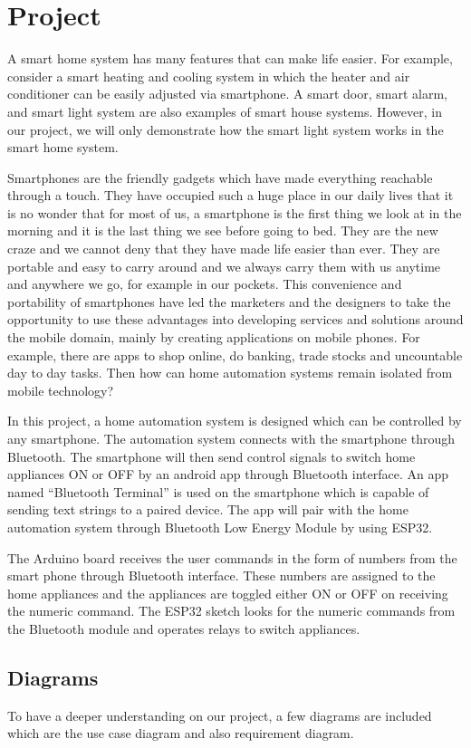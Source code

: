   \section{Project}
A smart home system has many features that can make life easier. For example, consider a smart heating and cooling system in which the heater and air conditioner can be easily adjusted via smartphone. A smart door, smart alarm, and smart light system are also examples of smart house systems. However, in our project, we will only demonstrate how the smart light system works in the smart home system.

Smartphones are the friendly gadgets which have made everything reachable through a touch. They have occupied such a huge place in our daily lives that it is no wonder that for most of us, a smartphone is the first thing we look at in the morning and it is the last thing we see before going to bed. They are the new craze and we cannot deny that they have made life easier than ever. They are portable and easy to carry around and we always carry them with us anytime and anywhere we go, for example in our pockets. This convenience and portability of smartphones have led the marketers and the designers to take the opportunity to use these advantages into developing services and solutions around the mobile domain, mainly by creating applications on mobile phones. For example, there are apps to shop online, do banking, trade stocks and uncountable day to day tasks. Then how can home automation systems remain isolated from mobile technology?
 
In this project, a home automation system is designed which can be controlled by any smartphone. The automation system connects with the smartphone through Bluetooth. The smartphone will then send control signals to switch home appliances ON or OFF by an android app through Bluetooth interface. An app named “Bluetooth Terminal” is used on the smartphone which is capable of sending text strings to a paired device. The app will pair with the home automation system through Bluetooth Low Energy Module by using ESP32.  
 
The Arduino board receives the user commands in the form of numbers from the smart phone through Bluetooth interface. These numbers are assigned to the home appliances and the appliances are toggled either ON or OFF on receiving the numeric command. The ESP32  sketch looks for the numeric commands from the Bluetooth module and operates relays to switch appliances.

\subsection{Diagrams}
To have a deeper understanding on our project, a few diagrams are included which are the use case diagram and also requirement diagram.


